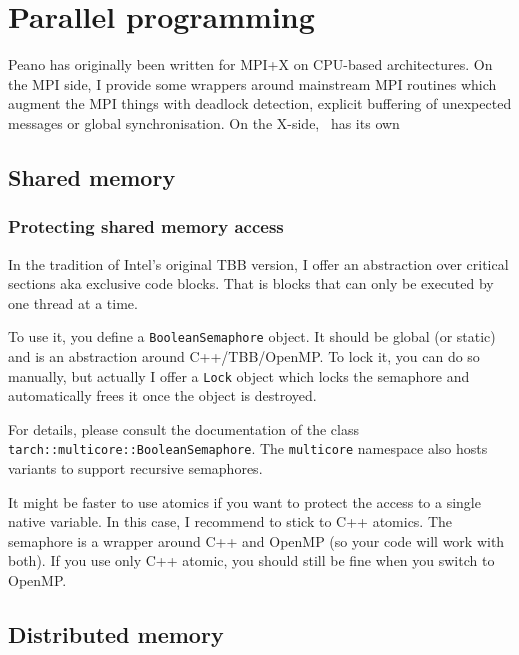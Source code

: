 \chapter{Parallel programming}
\label{section:parallel-programming}

Peano has originally been written for MPI+X on CPU-based architectures.
On the MPI side, I provide some wrappers around mainstream MPI routines which
augment the MPI things with deadlock detection, explicit buffering of unexpected
messages or global synchronisation.
On the X-side, \Peano\ has its own 


\section{Shared memory}

\subsection{Protecting shared memory access}
\label{section:parallel-programming:shared-mem:protect}

In the tradition of Intel's original TBB version, I offer an abstraction over
critical sections aka exclusive code blocks.
That is blocks that can only be executed by one thread at a time.

To use it, you define a \texttt{BooleanSemaphore} object.
It should be global (or static) and is an abstraction around C++/TBB/OpenMP.
To lock it, you can do so manually, but actually I offer a \texttt{Lock} object
which locks the semaphore and automatically frees it once the object is
destroyed.

For details, please consult the documentation of the class \linebreak
\texttt{tarch::multicore::BooleanSemaphore}. The \texttt{multicore} namespace
also hosts variants to support recursive semaphores.

\begin{remark}
 It might be faster to use atomics if you want to protect the access to a single
 native variable. In this case, I recommend to stick to C++ atomics. The
 semaphore is a wrapper around C++ and OpenMP (so your code will work with
 both). If you use only C++ atomic, you should still be fine when you switch to
 OpenMP.
\end{remark}


\section{Distributed memory}

